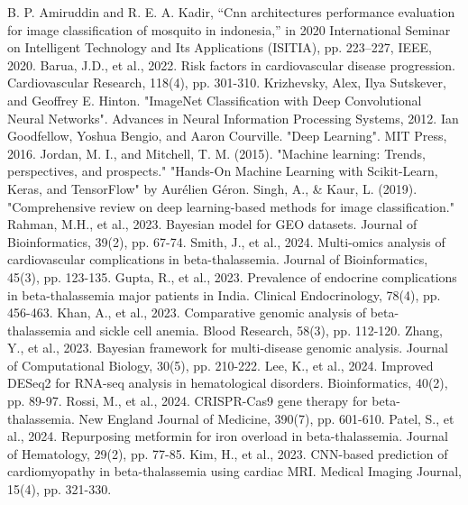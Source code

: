 \documentclass[a4paper,12pt,leqno,openbib,oneside]{memoir}
\theoremstyle{plain}
\theoremstyle{plain}
\theoremstyle{plain}
\theoremstyle{definition}
\theoremstyle{plain}
\theoremstyle{plain}
\theoremstyle{plain}
\begin{document}
\begin{thebibliography}{99}
 B. P. Amiruddin and R. E. A. Kadir, “Cnn architectures performance evaluation for image classification of mosquito in indonesia,” in 2020 International Seminar on Intelligent Technology and Its Applications (ISITIA), pp. 223–227, IEEE, 2020.
 Barua, J.D., et al., 2022. Risk factors in cardiovascular disease progression. Cardiovascular Research, 118(4), pp. 301-310.
 Krizhevsky, Alex, Ilya Sutskever, and Geoffrey E. Hinton. "ImageNet Classification with Deep Convolutional Neural Networks". Advances in Neural Information Processing Systems, 2012.
 Ian Goodfellow, Yoshua Bengio, and Aaron Courville. "Deep Learning". MIT Press, 2016.
 Jordan, M. I., and Mitchell, T. M. (2015). "Machine learning: Trends, perspectives, and prospects."
 "Hands-On Machine Learning with Scikit-Learn, Keras, and TensorFlow" by Aur\'elien G\'eron.
 Singh, A., \& Kaur, L. (2019). "Comprehensive review on deep learning-based methods for image classification."
 Rahman, M.H., et al., 2023. Bayesian model for GEO datasets. Journal of Bioinformatics, 39(2), pp. 67-74.
 Smith, J., et al., 2024. Multi-omics analysis of cardiovascular complications in beta-thalassemia. Journal of Bioinformatics, 45(3), pp. 123-135.
 Gupta, R., et al., 2023. Prevalence of endocrine complications in beta-thalassemia major patients in India. Clinical Endocrinology, 78(4), pp. 456-463.
 Khan, A., et al., 2023. Comparative genomic analysis of beta-thalassemia and sickle cell anemia. Blood Research, 58(3), pp. 112-120.
 Zhang, Y., et al., 2023. Bayesian framework for multi-disease genomic analysis. Journal of Computational Biology, 30(5), pp. 210-222.
 Lee, K., et al., 2024. Improved DESeq2 for RNA-seq analysis in hematological disorders. Bioinformatics, 40(2), pp. 89-97.
 Rossi, M., et al., 2024. CRISPR-Cas9 gene therapy for beta-thalassemia. New England Journal of Medicine, 390(7), pp. 601-610.
 Patel, S., et al., 2024. Repurposing metformin for iron overload in beta-thalassemia. Journal of Hematology, 29(2), pp. 77-85.
 Kim, H., et al., 2023. CNN-based prediction of cardiomyopathy in beta-thalassemia using cardiac MRI. Medical Imaging Journal, 15(4), pp. 321-330.
\end{thebibliography}
\end{document}
